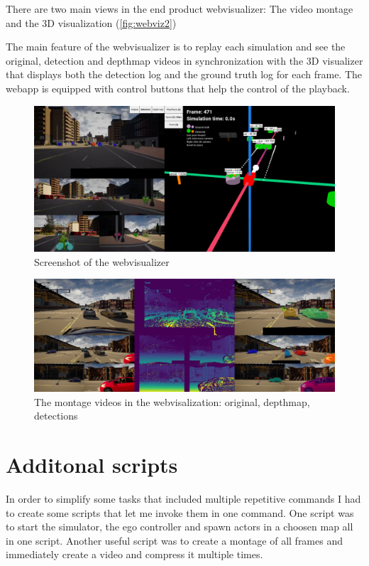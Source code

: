 There are two main views in the end product webvisualizer: The video montage and
the 3D visualization (\autoref{fig:webviz2})

The main feature of the webvisualizer is to replay each simulation and see the
original, detection and depthmap videos in synchronization with the 3D
visualizer that displays both the detection log and the ground truth log for
each frame. The webapp is equipped with control buttons that help the control of
the playback. 

\begin{figure}[!ht]
    \centering
    \includegraphics[width=150mm, keepaspectratio]{figures/webviz3.png}
    \caption{Screenshot of the webvisualizer}
    \label{fig:webviz2}
\end{figure}

\begin{figure}[!ht]
    \centering
    \includegraphics[width=150mm, keepaspectratio]{figures/detmontage.jpg}
    \caption{The montage videos in the webvisalization: original, depthmap, detections}
    \label{fig:detmontage}
\end{figure}


\section{Additonal scripts}

In order to simplify some tasks that included multiple repetitive commands I had
to create some scripts that let me invoke them in one command. One script was to
start the simulator, the ego controller and spawn actors in a choosen map all in
one script. Another useful script was to create a montage of all frames and
immediately create a video and compress it multiple times.
